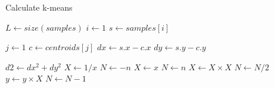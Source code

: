 \documentclass[12pt]{article}
\begin{document}
\begin{algorithm}
\caption{Calculate k-means}
\begin{algorithmic} 
\REQUIRE 
\ENSURE 
\STATE $L \leftarrow size(samples)$
\STATE $i \leftarrow 1$
\STATE $s \leftarrow samples[i]$

\STATE $j \leftarrow 1$
\STATE $c \leftarrow centroids[j]$
\STATE $dx \leftarrow s.x - c.x$
\STATE $dy \leftarrow s.y - c.y$

\STATE $d2 \leftarrow dx^2+dy^2$
\ENDWHILE
\ENDWHILE
{}
\STATE $X \leftarrow 1 / x$
\STATE $N \leftarrow -n$
\ELSE
\STATE $X \leftarrow x$
\STATE $N \leftarrow n$
\ENDIF
{}
\STATE $X \leftarrow X \times X$
\STATE $N \leftarrow N / 2$
\ELSE[$N$ is odd]
\STATE $y \leftarrow y \times X$
\STATE $N \leftarrow N - 1$
\ENDIF
\ENDWHILE
\end{algorithmic}
\end{algorithm}
\end{document}
